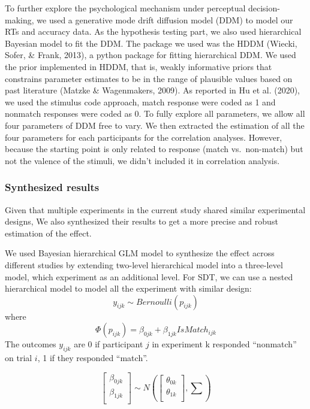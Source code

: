 \documentclass[
  english,
  man]{apa6}
\begin{document}
To further explore the psychological mechanism under perceptual decision-making, we used a generative mode drift diffusion model (DDM) to model our RTs and accuracy data. As the hypothesis testing part, we also used hierarchical Bayesian model to fit the DDM. The package we used was the HDDM (Wiecki, Sofer, \& Frank, 2013), a python package for fitting hierarchical DDM. We used the prior implemented in HDDM, that is, weakly informative priors that constrains parameter estimates to be in the range of plausible values based on past literature (Matzke \& Wagenmakers, 2009). As reported in Hu et al. (2020), we used the stimulus code approach, match response were coded as 1 and nonmatch responses were coded as 0. To fully explore all parameters, we allow all four parameters of DDM free to vary. We then extracted the estimation of all the four parameters for each participants for the correlation analyses. However, because the starting point is only related to response (match vs.~non-match) but not the valence of the stimuli, we didn't included it in correlation analysis.

\hypertarget{synthesized-results}{%
\subsubsection{Synthesized results}\label{synthesized-results}}

Given that multiple experiments in the current study shared similar experimental designs, We also synthesized their results to get a more precise and robust estimation of the effect.

We used Bayesian hierarchical GLM model to synthesize the effect across different studies by extending two-level hierarchical model into a three-level model, which experiment as an additional level. For SDT, we can use a nested hierarchical model to model all the experiment with similar design:
\[y_{ijk} \sim Bernoulli(p_{ijk})\]
where
\[ \Phi(p_{ijk}) =  \beta_{0jk} + \beta_{1jk}IsMatch_{ijk}\]
The outcomes \(y_{ijk}\) are 0 if participant \(j\) in experiment k responded \enquote{nonmatch} on trial \(i\), 1 if they responded \enquote{match}.

\[\begin{bmatrix}\beta_{0jk}\\
\beta_{1jk}\\
\end{bmatrix} \sim N(\begin{bmatrix}\theta_{0k}\\
\theta_{1k}\\
\end{bmatrix}, \sum)\]
\end{document}
